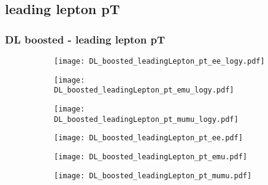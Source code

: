 \documentclass[aspectratio=169,8pt]{beamer}
\begin{document}
\subsection{leading lepton pT}
\begin{frame}
\frametitle{DL boosted - leading lepton pT}
\begin{figure}
\captionsetup[subfigure]{labelformat=empty}
\begin{subfigure}{0.32\textwidth}
\texttt{[image: DL\_boosted\_leadingLepton\_pt\_ee\_logy.pdf]}
\vspace*{-0.15cm}
\end{subfigure}
\hfil
\begin{subfigure}{0.32\textwidth}
\texttt{[image: DL\_boosted\_leadingLepton\_pt\_emu\_logy.pdf]}
\vspace*{-0.15cm}
\end{subfigure}
\hfil
\begin{subfigure}{0.32\textwidth}
\texttt{[image: DL\_boosted\_leadingLepton\_pt\_mumu\_logy.pdf]}
\vspace*{-0.15cm}
\end{subfigure}
\hfil
\begin{subfigure}{0.32\textwidth}
\texttt{[image: DL\_boosted\_leadingLepton\_pt\_ee.pdf]}
\vspace*{-0.15cm}
\end{subfigure}
\hfil
\begin{subfigure}{0.32\textwidth}
\texttt{[image: DL\_boosted\_leadingLepton\_pt\_emu.pdf]}
\vspace*{-0.15cm}
\end{subfigure}
\hfil
\begin{subfigure}{0.32\textwidth}
\texttt{[image: DL\_boosted\_leadingLepton\_pt\_mumu.pdf]}
\vspace*{-0.15cm}
\end{subfigure}
\hfil
\end{figure}
\end{frame}
\newpage
\end{document}
